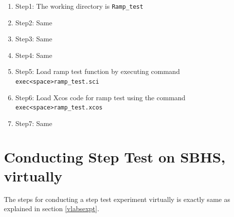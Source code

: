 \begin{enumerate}
\item Step1: The working directory is {\tt  Ramp\_test}
\item Step2: Same
\item Step3: Same
\item Step4: Same
\item Step5: Load ramp test function by executing command\\ {\tt exec<space>ramp\_test.sci}
\item Step6: Load Xcos code for ramp test using the command\\ {\tt exec<space>ramp\_test.xcos}
\item Step7: Same
\end{enumerate}

\section{Conducting Step Test on SBHS, virtually}
The steps for conducting a step test experiment virtually is exactly same as explained in section \ref{vlabsexpt}.

